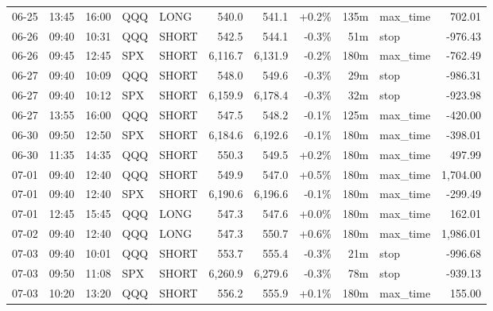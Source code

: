 \documentclass[11pt,a4paper,twoside]{article}
\begin{document}
\begin{center}
\begin{longtable}{>{\color{txtmain}}l l l l l r r r r >{\color{txtmain}}l r}
06-25 & 13:45 & 16:00 & QQQ & LONG & 540.0 & 541.1 & \textcolor{wingreen}{+0.2\%} & 135m & max\_time & \textcolor{wingreen}{702.01} \\
06-26 & 09:40 & 10:31 & QQQ & SHORT & 542.5 & 544.1 & \textcolor{lossred}{-0.3\%} & 51m & stop & \textcolor{lossred}{-976.43} \\
06-26 & 09:45 & 12:45 & SPX & SHORT & 6,116.7 & 6,131.9 & \textcolor{lossred}{-0.2\%} & 180m & max\_time & \textcolor{lossred}{-762.49} \\
06-27 & 09:40 & 10:09 & QQQ & SHORT & 548.0 & 549.6 & \textcolor{lossred}{-0.3\%} & 29m & stop & \textcolor{lossred}{-986.31} \\
06-27 & 09:40 & 10:12 & SPX & SHORT & 6,159.9 & 6,178.4 & \textcolor{lossred}{-0.3\%} & 32m & stop & \textcolor{lossred}{-923.98} \\
06-27 & 13:55 & 16:00 & QQQ & SHORT & 547.5 & 548.2 & \textcolor{lossred}{-0.1\%} & 125m & max\_time & \textcolor{lossred}{-420.00} \\
06-30 & 09:50 & 12:50 & SPX & SHORT & 6,184.6 & 6,192.6 & \textcolor{lossred}{-0.1\%} & 180m & max\_time & \textcolor{lossred}{-398.01} \\
06-30 & 11:35 & 14:35 & QQQ & SHORT & 550.3 & 549.5 & \textcolor{wingreen}{+0.2\%} & 180m & max\_time & \textcolor{wingreen}{497.99} \\
07-01 & 09:40 & 12:40 & QQQ & SHORT & 549.9 & 547.0 & \textcolor{wingreen}{+0.5\%} & 180m & max\_time & \textcolor{wingreen}{1,704.00} \\
07-01 & 09:40 & 12:40 & SPX & SHORT & 6,190.6 & 6,196.6 & \textcolor{lossred}{-0.1\%} & 180m & max\_time & \textcolor{lossred}{-299.49} \\
07-01 & 12:45 & 15:45 & QQQ & LONG & 547.3 & 547.6 & \textcolor{wingreen}{+0.0\%} & 180m & max\_time & \textcolor{wingreen}{162.01} \\
07-02 & 09:40 & 12:40 & QQQ & LONG & 547.3 & 550.7 & \textcolor{wingreen}{+0.6\%} & 180m & max\_time & \textcolor{wingreen}{1,986.01} \\
07-03 & 09:40 & 10:01 & QQQ & SHORT & 553.7 & 555.4 & \textcolor{lossred}{-0.3\%} & 21m & stop & \textcolor{lossred}{-996.68} \\
07-03 & 09:50 & 11:08 & SPX & SHORT & 6,260.9 & 6,279.6 & \textcolor{lossred}{-0.3\%} & 78m & stop & \textcolor{lossred}{-939.13} \\
07-03 & 10:20 & 13:20 & QQQ & SHORT & 556.2 & 555.9 & \textcolor{wingreen}{+0.1\%} & 180m & max\_time & \textcolor{wingreen}{155.00} \\

\end{longtable}
\end{center}
\end{document}
